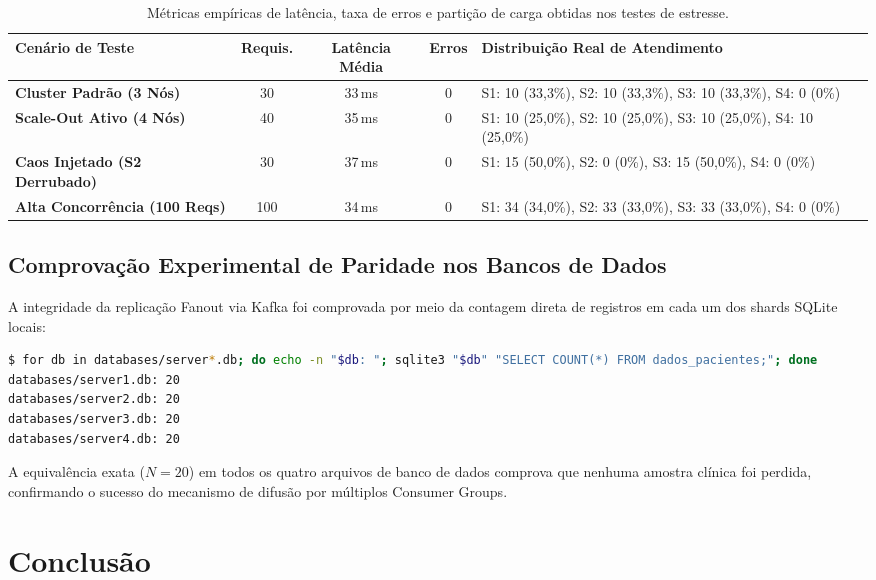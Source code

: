 \documentclass[12pt,a4paper]{article}
\begin{document}
\begin{table}[H]
	\centering
	\small
	\begin{tabularx}{\textwidth}{l c c c X}
		\toprule
		\textbf{Cenário de Teste} & \textbf{Requis.} & \textbf{Latência Média} & \textbf{Erros} & \textbf{Distribuição Real de Atendimento} \\
		\midrule
		\textbf{Cluster Padrão (3 Nós)} & 30 & 33\,ms & 0 & S1: 10 (33{,}3\%), S2: 10 (33{,}3\%), S3: 10 (33{,}3\%), S4: 0 (0\%) \\
		\textbf{Scale-Out Ativo (4 Nós)} & 40 & 35\,ms & 0 & S1: 10 (25{,}0\%), S2: 10 (25{,}0\%), S3: 10 (25{,}0\%), S4: 10 (25{,}0\%) \\
		\textbf{Caos Injetado (S2 Derrubado)} & 30 & 37\,ms & 0 & S1: 15 (50{,}0\%), S2: 0 (0\%), S3: 15 (50{,}0\%), S4: 0 (0\%) \\
		\textbf{Alta Concorrência (100 Reqs)} & 100 & 34\,ms & 0 & S1: 34 (34{,}0\%), S2: 33 (33{,}0\%), S3: 33 (33{,}0\%), S4: 0 (0\%) \\
		\bottomrule
	\end{tabularx}
	\caption{Métricas empíricas de latência, taxa de erros e partição de carga obtidas nos testes de estresse.}
	\label{tab:benchmark_experimental}
\end{table}

\subsection{Comprovação Experimental de Paridade nos Bancos de Dados}
A integridade da replicação Fanout via Kafka foi comprovada por meio da contagem direta de registros em cada um dos shards SQLite locais:
\begin{lstlisting}[language=bash]
$ for db in databases/server*.db; do echo -n "$db: "; sqlite3 "$db" "SELECT COUNT(*) FROM dados_pacientes;"; done
databases/server1.db: 20
databases/server2.db: 20
databases/server3.db: 20
databases/server4.db: 20
\end{lstlisting}

A equivalência exata ($N=20$) em todos os quatro arquivos de banco de dados comprova que nenhuma amostra clínica foi perdida, confirmando o sucesso do mecanismo de difusão por múltiplos Consumer Groups.

\newpage

\section{Conclusão}
\label{sec:conclusao}
\end{document}
